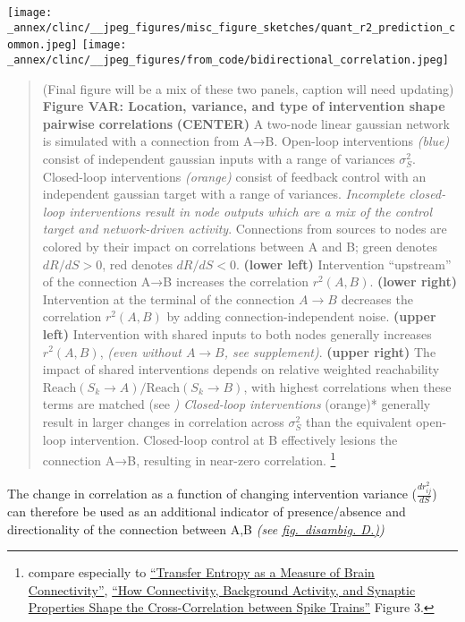 \texttt{[image: \_annex/clinc/\_\_jpeg\_figures/misc\_figure\_sketches/quant\_r2\_prediction\_common.jpeg]}
\texttt{[image: \_annex/clinc/\_\_jpeg\_figures/from\_code/bidirectional\_correlation.jpeg]}

\begin{quote}
(Final figure will be a mix of these two panels, caption will need
updating) \textbf{Figure VAR: Location, variance, and type of
intervention shape pairwise correlations} \textbf{(CENTER)} A two-node
linear gaussian network is simulated with a connection from A→B.
Open-loop interventions \emph{(blue)} consist of independent gaussian
inputs with a range of variances \(\sigma^2_S\). Closed-loop
interventions \emph{(orange)} consist of feedback control with an
independent gaussian target with a range of variances. \emph{Incomplete
closed-loop interventions result in node outputs which are a mix of the
control target and network-driven activity}. Connections from sources to
nodes are colored by their impact on correlations between A and B; green
denotes \(dR/dS > 0\), red denotes \(dR/dS<0\). \textbf{(lower left)}
Intervention ``upstream'' of the connection A→B increases the
correlation \(r^2(A,B)\). \textbf{(lower right)} Intervention at the
terminal of the connection \(A\rightarrow B\) decreases the correlation
\(r^2(A,B)\) by adding connection-independent noise. \textbf{(upper
left)} Intervention with shared inputs to both nodes generally increases
\(r^2(A,B)\), \emph{(even without \(A\rightarrow B\), see supplement)}.
\textbf{(upper right)} The impact of shared interventions depends on
relative weighted reachability
\(\text{Reach}(S_k\rightarrow A) / \text{Reach}(S_k\rightarrow B)\), with highest correlations
when these terms are matched (see \emph{) Closed-loop interventions
}(orange)* generally result in larger changes in correlation across
\(\sigma^2_S\) than the equivalent open-loop intervention. Closed-loop
control at B effectively lesions the connection A→B, resulting in
near-zero correlation. \footnote{compare especially to
  \href{https://www.frontiersin.org/articles/10.3389/fncom.2020.00045/full}{``Transfer
  Entropy as a Measure of Brain Connectivity''},
  \href{https://www.jneurosci.org/content/29/33/10234}{``How
  Connectivity, Background Activity, and Synaptic Properties Shape the
  Cross-Correlation between Spike Trains''} Figure 3.}
\end{quote}

 The change in correlation as a function of changing intervention
variance (\(\frac{dr^2_{ij}}{dS}\)) can therefore be used as an
additional indicator of presence/absence and directionality of the
connection between A,B \emph{(see \href{fig-disambig}{fig.~disambig.
D.)})} 

